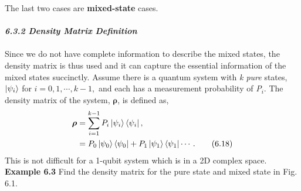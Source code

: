 \documentclass{article}
\newcommand{\bfit}[1]{\textit{\textbf{#1}}}
\begin{document}
The last two cases are \textbf{mixed-state} cases.\\\\
\bfit{\large 6.3.2 Density Matrix Definition}\\\\
Since we do not have complete information to describe the mixed states,
the density matrix is thus used and it can capture the essential information of the mixed
states succinctly. Assume there is a quantum system with \textit{k pure} states,
$\ket{\psi_i}$ for $i=0,1,\cdots,k-1,$ and each has a measurement probability of \textit{P}$_i$. 
The density matrix of the system, $\boldsymbol{\rho}$, is defined as,
\begin{align*} \label{eq 6.18}
    \boldsymbol{\rho}&=\sum_{i=1}^{k-1}P_i\ket{\psi_i}\bra{\psi_i},\\
    &=P_0\ket{\psi_0}\bra{\psi_0}+P_1\ket{\psi_1}\bra{\psi_1}\cdots. \tag{6.18}
\end{align*}
This is not difficult for a 1-qubit system which is in a 2D complex space.\\
\textbf{Example 6.3} Find the density matrix for the pure state and mixed state in Fig. 6.1.
\end{document}
